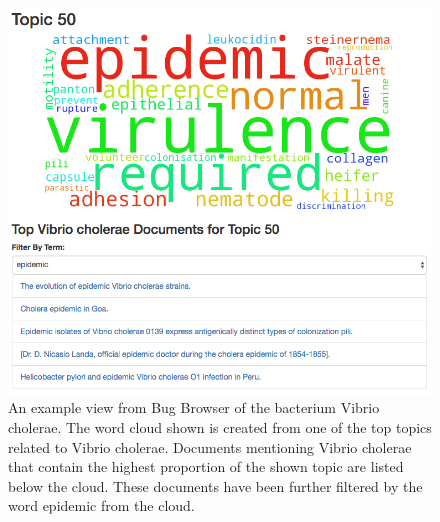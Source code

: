 \documentclass{bioinfo}
\begin{document}
\begin{figure}[!tpb]%
	\centerline{\includegraphics[scale=0.3]{fig01.png}}
\caption{An example view from Bug Browser of the bacterium Vibrio cholerae. The word cloud shown is created from one of the top topics related to Vibrio cholerae. Documents mentioning Vibrio cholerae that contain the highest proportion of the shown topic are listed below the cloud. These documents have been further filtered by the word epidemic from the cloud.  }\label{fig:01}
\end{figure}
\end{document}
